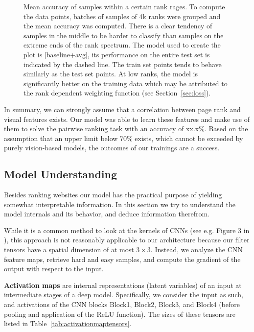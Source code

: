 \begin{figure}
\begin{tikzpicture}
      \end{tikzpicture}
    \caption[Accuracy vs. rank]{Mean accuracy of samples within a certain rank rages. To compute the data points, batches of samples of 4k ranks were grouped and the mean accuracy was computed. There is a clear tendency of samples in the middle to be harder to classify than samples on the extreme ends of the rank spectrum. The model used to create the plot is [baseline+avg], its performance on the entire test set is indicated by the dashed line. The train set points tends to behave similarly as the test set points. At low ranks, the model is significantly better on the training data which may be attributed to the rank dependent weighting function (see Section~\ref{sec:loss}).}
    \label{fig:accvsrank}
\end{figure}

In summary, we can strongly assume that a correlation between page rank and visual features exists. Our model was able to learn these features and make use of them to solve the pairwise ranking task with an accuracy of xx.x\%. Based on the assumption that an upper limit below 70\% exists, which cannot be exceeded by purely vision-based models, the outcomes of our trainings are a success.

\subsection{Model Understanding}

Besides ranking websites our model has the practical purpose of yielding somewhat interpretable information. In this section we try to understand the model internals and its behavior, and deduce information therefrom.

While it is a common method to look at the kernels of CNNs (see e.g. Figure 3 in \cite{krizhevsky:imagenet}), this approach is not reasonably applicable to our architecture because our filter tensors have a spatial dimension of at most $3\times3$. Instead, we analyze the CNN feature maps, retrieve hard and easy samples, and compute the gradient of the output with respect to the input.

\textbf{Activation maps} are internal representations (latent variables) of an input at intermediate stages of a deep model. Specifically, we consider the input as such, and activations of the CNN blocks Block1, Block2, Block3, and Block4 (before pooling and application of the ReLU function). The sizes of these tensors are listed in Table~\ref{tab:activationmaptensors}.

